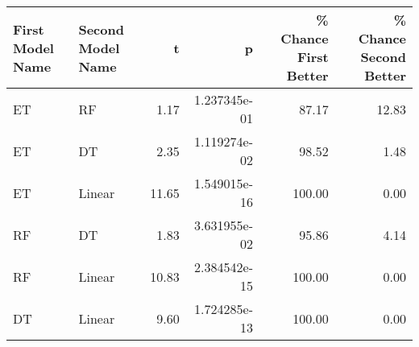 \begin{tabular}{llrrrr}
\toprule
First Model Name & Second Model Name &     t &            p &  \% Chance First Better &  \% Chance Second Better \\
\midrule
              ET &                RF &  1.17 & 1.237345e-01 &                  87.17 &                   12.83 \\
              ET &                DT &  2.35 & 1.119274e-02 &                  98.52 &                    1.48 \\
              ET &            Linear & 11.65 & 1.549015e-16 &                 100.00 &                    0.00 \\
              RF &                DT &  1.83 & 3.631955e-02 &                  95.86 &                    4.14 \\
              RF &            Linear & 10.83 & 2.384542e-15 &                 100.00 &                    0.00 \\
              DT &            Linear &  9.60 & 1.724285e-13 &                 100.00 &                    0.00 \\
\bottomrule
\end{tabular}
